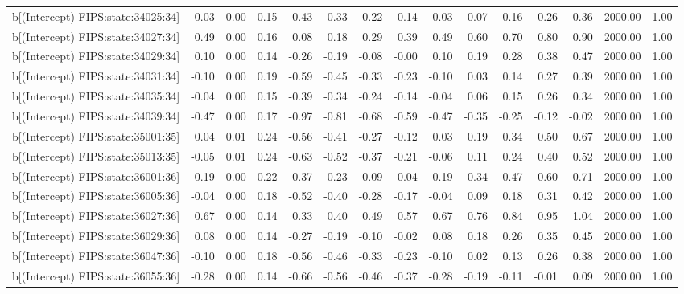 \begin{table}[ht]
\begin{tabular}{rrrrrrrrrrrrrrr}
  b[(Intercept) FIPS:state:34025:34] & -0.03 & 0.00 & 0.15 & -0.43 & -0.33 & -0.22 & -0.14 & -0.03 & 0.07 & 0.16 & 0.26 & 0.36 & 2000.00 & 1.00 \\ 
  b[(Intercept) FIPS:state:34027:34] & 0.49 & 0.00 & 0.16 & 0.08 & 0.18 & 0.29 & 0.39 & 0.49 & 0.60 & 0.70 & 0.80 & 0.90 & 2000.00 & 1.00 \\ 
  b[(Intercept) FIPS:state:34029:34] & 0.10 & 0.00 & 0.14 & -0.26 & -0.19 & -0.08 & -0.00 & 0.10 & 0.19 & 0.28 & 0.38 & 0.47 & 2000.00 & 1.00 \\ 
  b[(Intercept) FIPS:state:34031:34] & -0.10 & 0.00 & 0.19 & -0.59 & -0.45 & -0.33 & -0.23 & -0.10 & 0.03 & 0.14 & 0.27 & 0.39 & 2000.00 & 1.00 \\ 
  b[(Intercept) FIPS:state:34035:34] & -0.04 & 0.00 & 0.15 & -0.39 & -0.34 & -0.24 & -0.14 & -0.04 & 0.06 & 0.15 & 0.26 & 0.34 & 2000.00 & 1.00 \\ 
  b[(Intercept) FIPS:state:34039:34] & -0.47 & 0.00 & 0.17 & -0.97 & -0.81 & -0.68 & -0.59 & -0.47 & -0.35 & -0.25 & -0.12 & -0.02 & 2000.00 & 1.00 \\ 
  b[(Intercept) FIPS:state:35001:35] & 0.04 & 0.01 & 0.24 & -0.56 & -0.41 & -0.27 & -0.12 & 0.03 & 0.19 & 0.34 & 0.50 & 0.67 & 2000.00 & 1.00 \\ 
  b[(Intercept) FIPS:state:35013:35] & -0.05 & 0.01 & 0.24 & -0.63 & -0.52 & -0.37 & -0.21 & -0.06 & 0.11 & 0.24 & 0.40 & 0.52 & 2000.00 & 1.00 \\ 
  b[(Intercept) FIPS:state:36001:36] & 0.19 & 0.00 & 0.22 & -0.37 & -0.23 & -0.09 & 0.04 & 0.19 & 0.34 & 0.47 & 0.60 & 0.71 & 2000.00 & 1.00 \\ 
  b[(Intercept) FIPS:state:36005:36] & -0.04 & 0.00 & 0.18 & -0.52 & -0.40 & -0.28 & -0.17 & -0.04 & 0.09 & 0.18 & 0.31 & 0.42 & 2000.00 & 1.00 \\ 
  b[(Intercept) FIPS:state:36027:36] & 0.67 & 0.00 & 0.14 & 0.33 & 0.40 & 0.49 & 0.57 & 0.67 & 0.76 & 0.84 & 0.95 & 1.04 & 2000.00 & 1.00 \\ 
  b[(Intercept) FIPS:state:36029:36] & 0.08 & 0.00 & 0.14 & -0.27 & -0.19 & -0.10 & -0.02 & 0.08 & 0.18 & 0.26 & 0.35 & 0.45 & 2000.00 & 1.00 \\ 
  b[(Intercept) FIPS:state:36047:36] & -0.10 & 0.00 & 0.18 & -0.56 & -0.46 & -0.33 & -0.23 & -0.10 & 0.02 & 0.13 & 0.26 & 0.38 & 2000.00 & 1.00 \\ 
  b[(Intercept) FIPS:state:36055:36] & -0.28 & 0.00 & 0.14 & -0.66 & -0.56 & -0.46 & -0.37 & -0.28 & -0.19 & -0.11 & -0.01 & 0.09 & 2000.00 & 1.00 \\ 

\end{tabular}
\end{table}
